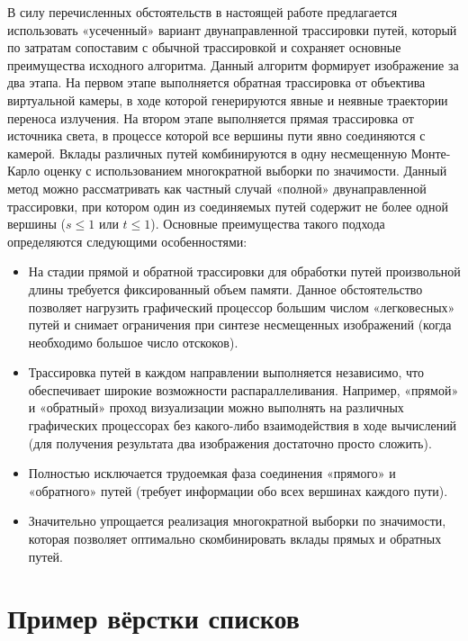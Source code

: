 В силу перечисленных обстоятельств в настоящей работе предлагается использовать «усеченный» вариант двунаправленной трассировки путей, который по затратам сопоставим с обычной трассировкой и сохраняет основные преимущества исходного алгоритма. Данный алгоритм формирует изображение за два этапа. На первом этапе выполняется обратная трассировка от объектива виртуальной камеры, в ходе которой генерируются явные и неявные траектории переноса излучения. На втором этапе выполняется прямая трассировка от источника света, в процессе которой все вершины пути явно соединяются с камерой. Вклады различных путей комбинируются в одну несмещенную Монте-Карло оценку с использованием многократной выборки по значимости. Данный метод можно рассматривать как частный случай «полной» двунаправленной трассировки, при котором один из соединяемых путей содержит не более одной вершины ($s \le 1$ или $t \le 1$). Основные преимущества такого подхода определяются следующими особенностями:

\begin{itemize}  
  \item На стадии прямой и обратной трассировки для обработки путей произвольной длины требуется фиксированный объем памяти. Данное обстоятельство позволяет нагрузить графический процессор большим числом «легковесных» путей и снимает ограничения при синтезе несмещенных изображений (когда необходимо большое число отскоков).
  
  \item Трассировка путей в каждом направлении выполняется независимо, что обеспечивает широкие возможности распараллеливания. Например, «прямой» и «обратный» проход визуализации можно выполнять на различных графических процессорах без какого-либо взаимодействия в ходе вычислений (для получения результата два изображения достаточно просто сложить).
  
  \item Полностью исключается трудоемкая фаза соединения «прямого» и «обратного» путей (требует информации обо всех вершинах каждого пути).
  
  \item Значительно упрощается реализация многократной выборки по значимости, которая позволяет оптимально скомбинировать вклады прямых и обратных путей.
\end{itemize}

\section{Пример вёрстки списков} \label{sect2_3}

